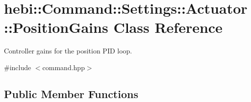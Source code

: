 \hypertarget{classhebi_1_1Command_1_1Settings_1_1Actuator_1_1PositionGains}{}\section{hebi\+:\+:Command\+:\+:Settings\+:\+:Actuator\+:\+:Position\+Gains Class Reference}
\label{classhebi_1_1Command_1_1Settings_1_1Actuator_1_1PositionGains}


Controller gains for the position P\+ID loop.  




{\ttfamily \#include $<$command.\+hpp$>$}

\subsection*{Public Member Functions}
